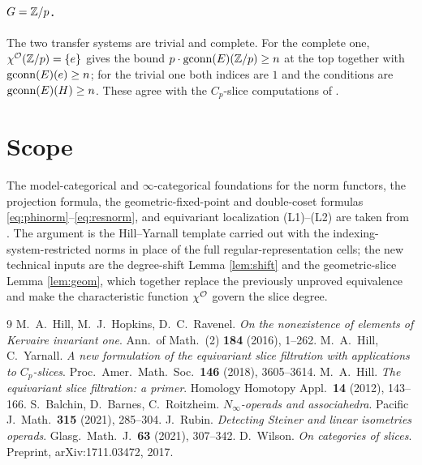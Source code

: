 \paragraph{$G=\mathbb{Z}/p$.} The two transfer systems are trivial and complete. For the
complete one, $\chi^{\mathcal{O}}(\mathbb{Z}/p)=\{e\}$ gives the bound $p\cdot\operatorname{gconn}(E)(\mathbb{Z}/p)\ge n$
at the top together with $\operatorname{gconn}(E)(e)\ge n$; for the trivial one both indices
are $1$ and the conditions are $\operatorname{gconn}(E)(H)\ge n$. These agree with the
$C_p$-slice computations of \cite{HY18}.

\section*{Scope}

The model-categorical and $\infty$-categorical foundations for the
norm functors, the projection formula, the geometric-fixed-point and double-coset
formulas \eqref{eq:phinorm}--\eqref{eq:resnorm}, and equivariant localization
(L1)--(L2) are taken from \cite{HHR16, HillPrimer, BBR, Rubin}. The argument is the
Hill--Yarnall template \cite{HY18} carried out with the
indexing-system-restricted norms in place of the full regular-representation
cells; the new technical inputs are the degree-shift Lemma \ref{lem:shift} and the
geometric-slice Lemma \ref{lem:geom}, which together replace the previously
unproved equivalence and make the characteristic function $\chi^{\mathcal{O}}$ govern the
slice degree.

\begin{thebibliography}{9}
 M.~A.~Hill, M.~J.~Hopkins, D.~C.~Ravenel.
  \emph{On the nonexistence of elements of Kervaire invariant one}.
  Ann.\ of Math.\ (2) \textbf{184} (2016), 1--262.
 M.~A.~Hill, C.~Yarnall.
  \emph{A new formulation of the equivariant slice filtration with applications
  to $C_p$-slices}. Proc.\ Amer.\ Math.\ Soc.\ \textbf{146} (2018), 3605--3614.
 M.~A.~Hill.
  \emph{The equivariant slice filtration: a primer}.
  Homology Homotopy Appl.\ \textbf{14} (2012), 143--166.
 S.~Balchin, D.~Barnes, C.~Roitzheim.
  \emph{$N_\infty$-operads and associahedra}.
  Pacific J.\ Math.\ \textbf{315} (2021), 285--304.
 J.~Rubin.
  \emph{Detecting Steiner and linear isometries operads}.
  Glasg.\ Math.\ J.\ \textbf{63} (2021), 307--342.
 D.~Wilson.
  \emph{On categories of slices}. Preprint, arXiv:1711.03472, 2017.
\end{thebibliography}

\endgroup